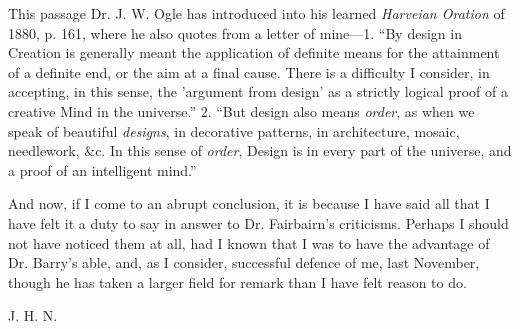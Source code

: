 This passage Dr. J. W. Ogle has introduced into
his learned \emph{Harveian Oration} of 1880, p. 161, where he also
quotes from a letter of mine—1. ``By design in Creation is generally
meant the application of definite means for the attainment of a
definite end, or the aim at a final cause. There is a difficulty I
consider, in accepting, in this sense, the 'argument from design' as a
strictly logical proof of a creative Mind in the universe.'' 2. ``But
design also means \emph{order}, as when we speak of beautiful \emph{designs},
in decorative patterns, in architecture, mosaic, needlework, \&c.
In this sense of \emph{order}, Design is in every part of the
universe, and a proof of an intelligent mind.''

And now, if I come to an abrupt conclusion, it is
because I have said all that I have felt it a duty to say in answer to
Dr. Fairbairn's criticisms. Perhaps I should not have noticed them at
all, had I known that I was to have the advantage of Dr. Barry's able,
and, as I consider, successful defence of me, last November,
though he has taken a larger field for remark than I have felt reason
to do.

J. H. N.

